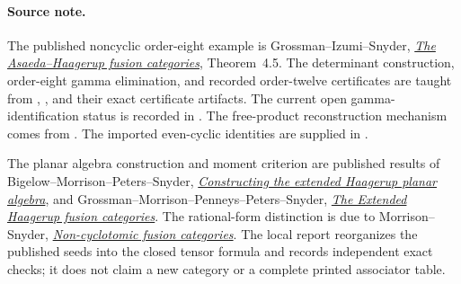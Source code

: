 \paragraph{Source note.}
The published noncyclic order-eight example is Grossman--Izumi--Snyder,
\href{https://arxiv.org/abs/1501.07324}{\emph{The Asaeda--Haagerup
fusion categories}}, Theorem~4.5. The determinant construction,
order-eight gamma elimination, and recorded order-twelve certificates
are taught from ,
, and their exact
certificate artifacts. The current open gamma-identification status
is recorded in .
The free-product reconstruction mechanism comes from
.
The imported even-cyclic identities are supplied in
.

The planar algebra construction and moment criterion are published
results of Bigelow--Morrison--Peters--Snyder,
\href{https://arxiv.org/abs/0909.4099}{\emph{Constructing the extended
Haagerup planar algebra}}, and Grossman--Morrison--Penneys--Peters--Snyder,
\href{https://arxiv.org/abs/1810.06076}{\emph{The Extended Haagerup
fusion categories}}. The rational-form distinction is due to
Morrison--Snyder, \href{https://arxiv.org/abs/1002.0168}{\emph{Non-cyclotomic
fusion categories}}. The local report
reorganizes the published seeds into the closed tensor formula and
records independent exact checks; it does not claim a new category
or a complete printed associator table.
